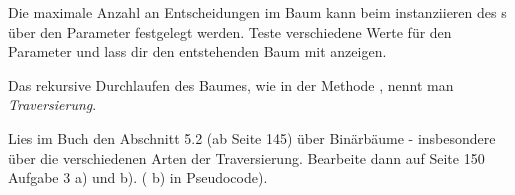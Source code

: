 \documentclass[10pt, a4paper]{scrartcl}
\begin{document}
\begin{aufgabe}
	Die maximale Anzahl an Entscheidungen im Baum kann beim instanziieren des s
	über den Parameter  festgelegt werden. Teste verschiedene Werte für
	den Parameter und lass dir den entstehenden Baum mit  anzeigen.
\end{aufgabe}

\begin{aufgabe}
	Das rekursive Durchlaufen des Baumes, wie in der Methode , nennt man
	\emph{Traversierung}.
	
	Lies im Buch den Abschnitt 5.2 (ab Seite 145) über Binärbäume - insbesondere über die 
	verschiedenen Arten der Traversierung. Bearbeite dann auf Seite 150 Aufgabe 3 a) und b).
	( b) in Pseudocode).
\end{aufgabe}
\end{document}
